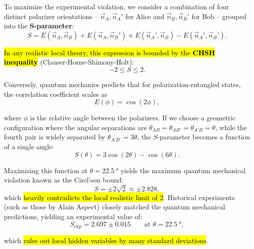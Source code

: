 To maximize the experimental violation, we consider a combination of four distinct polarizer orientations -- $\vec{n}_A, \vec{n}_A'$ for Alice and $\vec{n}_B, \vec{n}_B'$ for Bob -- grouped into the $\mathbf{S}$\textbf{-parameter}:
\begin{equation}\label{eqn:15-s-parameter}
S = E(\vec{n}_A,\vec{n}_B) + E(\vec{n}_A,\vec{n}_B') + E(\vec{n}_A',\vec{n}_B) - E(\vec{n}_A',\vec{n}_B').
\end{equation}

\hl{In any realistic local theory, this expression is bounded by the \textbf{CHSH inequality}} (Clauser-Horne-Shimony-Holt):
\begin{equation}\label{eqn:15-chsh-bounds}
-2 \leq S \leq 2.
\end{equation}

Conversely, quantum mechanics predicts that for polarization-entangled states, the correlation coefficient scales as 
\begin{equation}\label{eqn:15-quantum-correlation-2}
E(\phi) = \cos(2\phi), 
\end{equation}

where $\phi$ is the relative angle between the polarizers. If we choose a geometric configuration where the angular separations are $\theta_{AB} = \theta_{AB'} = \theta_{A'B} = \theta$, while the fourth pair is widely separated by $\theta_{A'B'} = 3\theta$, the $S$-parameter becomes a function of a single angle:
\begin{equation}\label{eqn:15-s-theta}
S(\theta) = 3\cos(2\theta) - \cos(6\theta).
\end{equation}

Maximizing this function at $\theta = \qty{22.5}{\degree}$ yields the maximum quantum mechanical violation known as the Cirel'son bound:
\begin{equation}\label{eqn:15-tsirelson-bound}
S = \pm 2\sqrt{2} \approx \pm 2.828,
\end{equation}
which \hl{heavily contradicts the local realistic limit of $2$}. Historical experiments (such as those by Alain Aspect) closely matched the quantum mechanical predictions, yielding an experimental value of:
\begin{equation}\label{eqn:15-experimental-s-chsh}
S_{\text{exp}} = 2.697 \pm 0.015 \qquad \text{at } \theta = \qty{22.5}{\degree},
\end{equation}

which \hl{rules out local hidden variables by many standard deviations}.

